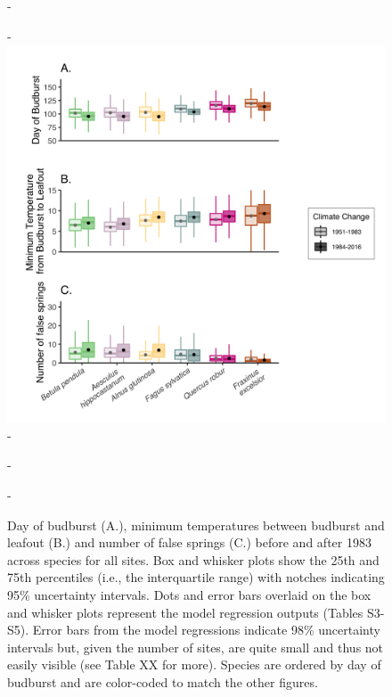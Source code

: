 \documentclass{article}\usepackage[]{graphicx}\usepackage[]{color}
\begin{document}
{\begin{figure} [H]
  -\begin{center}
  -\includegraphics[width=14cm]{..//analyses/figures/Boxplot_BBTminFS_noDots_modests.png}
  -\caption{Day of budburst (A.), minimum temperatures between budburst and leafout (B.) and number of false springs (C.) before and after 1983 across species for all sites. Box and whisker plots show the 25th and 75th percentiles (i.e., the interquartile range) with notches indicating 95\% uncertainty intervals. Dots and error bars overlaid on the box and whisker plots represent the model regression outputs (Tables S3-S5). Error bars from the model regressions indicate 98\% uncertainty intervals but, given the number of sites, are quite small and thus not easily visible (see Table XX for more). Species are ordered by day of budburst and are color-coded to match the other figures.  }\label{fig:boxfs}
  -\end{center}
  -\end{figure}}
  
\end{document}
